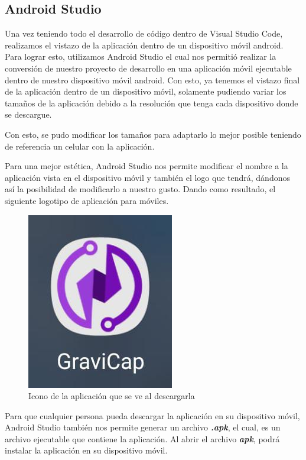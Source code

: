             \subsection{Android Studio}
                Una vez teniendo todo el desarrollo de código dentro de Visual Studio Code, realizamos el vistazo de la aplicación dentro de un dispositivo móvil android. Para lograr esto, utilizamos Android Studio el cual nos permitió realizar la conversión de nuestro proyecto de desarrollo en una aplicación móvil ejecutable dentro de nuestro dispositivo móvil android. Con esto, ya tenemos el vistazo final de la aplicación dentro de un dispositivo móvil, solamente pudiendo variar los tamaños de la aplicación debido a la resolución que tenga cada dispositivo donde se descargue.\par
                Con esto, se pudo modificar los tamaños para adaptarlo lo mejor posible teniendo de referencia un celular con la aplicación.\par
                Para una mejor estética, Android Studio nos permite modificar el nombre a la aplicación vista en el dispositivo móvil y también el logo que tendrá, dándonos así la posibilidad de modificarlo a nuestro gusto. Dando como resultado, el siguiente logotipo de aplicación para móviles.\par

                \begin{figure} [H]
                    \centering
                    \includegraphics[width=0.5\linewidth]{Imagenes/Aplicación/Icon.jpg}
                    \caption{Icono de la aplicación que se ve al descargarla}
                    \label{fig:a21}
                \end{figure}
                
                Para que cualquier persona pueda descargar la aplicación en su dispositivo móvil, Android Studio también nos permite generar un archivo \textbf{\textit{.apk}}, el cual, es un archivo ejecutable que contiene la aplicación. Al abrir el archivo \textit{\textbf{apk}}, podrá instalar la aplicación en su dispositivo móvil.\par
